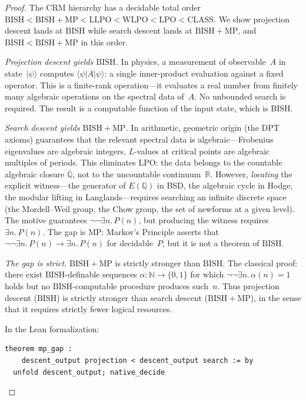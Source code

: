 \documentclass[11pt]{article}
\theoremstyle{definition}
\theoremstyle{remark}
\newcommand{\N}{\mathbb{N}}
\newcommand{\Q}{\mathbb{Q}}
\newcommand{\R}{\mathbb{R}}
\newcommand{\BISH}{\mathrm{BISH}}
\newcommand{\LPO}{\mathrm{LPO}}
\newcommand{\WLPO}{\mathrm{WLPO}}
\newcommand{\LLPO}{\mathrm{LLPO}}
\newcommand{\MP}{\mathrm{MP}}
\newcommand{\CLASS}{\mathrm{CLASS}}
\begin{document}
\begin{proof}
The CRM hierarchy has a decidable total order $\BISH < \BISH{+}\MP < \LLPO < \WLPO < \LPO < \CLASS$. We show projection descent lands at $\BISH$ while search descent lands at $\BISH + \MP$, and $\BISH < \BISH + \MP$ in this order.

\emph{Projection descent yields $\BISH$.}
In physics, a measurement of observable~$A$ in state~$|\psi\rangle$ computes $\langle \psi | A | \psi \rangle$: a single inner-product evaluation against a fixed operator. This is a finite-rank operation---it evaluates a real number from finitely many algebraic operations on the spectral data of~$A$. No unbounded search is required. The result is a computable function of the input state, which is $\BISH$.

\emph{Search descent yields $\BISH + \MP$.}
In arithmetic, geometric origin (the DPT axioms) guarantees that the relevant spectral data is algebraic---Frobenius eigenvalues are algebraic integers, $L$-values at critical points are algebraic multiples of periods. This eliminates $\LPO$: the data belongs to the countable algebraic closure $\overline{\Q}$, not to the uncountable continuum~$\R$. However, \emph{locating} the explicit witness---the generator of $E(\Q)$ in BSD, the algebraic cycle in Hodge, the modular lifting in Langlands---requires searching an infinite discrete space (the Mordell--Weil group, the Chow group, the set of newforms at a given level). The motive guarantees $\neg\neg\exists n.\, P(n)$, but producing the witness requires $\exists n.\, P(n)$. The gap is $\MP$: Markov's Principle asserts that $\neg\neg\exists n.\, P(n) \to \exists n.\, P(n)$ for decidable~$P$, but it is not a theorem of $\BISH$.

\emph{The gap is strict.}
$\BISH + \MP$ is strictly stronger than $\BISH$. The classical proof: there exist $\BISH$-definable sequences $\alpha : \N \to \{0,1\}$ for which $\neg\neg\exists n.\,\alpha(n) = 1$ holds but no $\BISH$-computable procedure produces such~$n$. Thus projection descent ($\BISH$) is strictly stronger than search descent ($\BISH + \MP$), in the sense that it requires strictly fewer logical resources.

In the Lean formalization:
\begin{lstlisting}
theorem mp_gap :
    descent_output projection < descent_output search := by
  unfold descent_output; native_decide
\end{lstlisting}
\end{proof}
\end{document}
